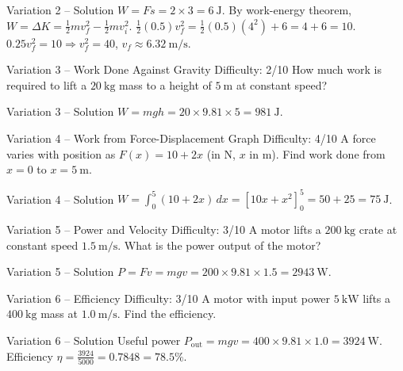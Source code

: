 \documentclass[11pt]{beamer}
\begin{document}
\begin{frame}{Variation 2 – Solution}
$W = F s = 2\times3 = 6\ \mathrm{J}$. By work-energy theorem, $W = \Delta K = \frac12 m v_f^2 - \frac12 m v_i^2$.
$\frac12 (0.5) v_f^2 = \frac12 (0.5)(4^2) + 6 = 4 + 6 = 10$.
$0.25 v_f^2 = 10 \Rightarrow v_f^2 = 40$, $v_f \approx 6.32\ \mathrm{m/s}$.
\end{frame}

\begin{frame}[shrink=15]{Variation 3 – Work Done Against Gravity \hfill Difficulty: 2/10}
How much work is required to lift a $20\ \mathrm{kg}$ mass to a height of $5\ \mathrm{m}$ at constant speed?
\end{frame}

\begin{frame}{Variation 3 – Solution}
$W = mgh = 20\times9.81\times5 = 981\ \mathrm{J}$.
\end{frame}

\begin{frame}[shrink=15]{Variation 4 – Work from Force-Displacement Graph \hfill Difficulty: 4/10}
A force varies with position as $F(x) = 10 + 2x$ (in N, $x$ in m). Find work done from $x=0$ to $x=5\ \mathrm{m}$.
\end{frame}

\begin{frame}{Variation 4 – Solution}
$W = \int_0^5 (10+2x)\,dx = [10x + x^2]_0^5 = 50 + 25 = 75\ \mathrm{J}$.
\end{frame}

\begin{frame}[shrink=15]{Variation 5 – Power and Velocity \hfill Difficulty: 3/10}
A motor lifts a $200\ \mathrm{kg}$ crate at constant speed $1.5\ \mathrm{m/s}$. What is the power output of the motor?
\end{frame}

\begin{frame}{Variation 5 – Solution}
$P = Fv = mgv = 200\times9.81\times1.5 = 2943\ \mathrm{W}$.
\end{frame}

\begin{frame}[shrink=15]{Variation 6 – Efficiency \hfill Difficulty: 3/10}
A motor with input power $5\ \mathrm{kW}$ lifts a $400\ \mathrm{kg}$ mass at $1.0\ \mathrm{m/s}$. Find the efficiency.
\end{frame}

\begin{frame}{Variation 6 – Solution}
Useful power $P_{\text{out}} = mgv = 400\times9.81\times1.0 = 3924\ \mathrm{W}$.
Efficiency $\eta = \frac{3924}{5000} = 0.7848 = 78.5\%$.
\end{frame}
\end{document}
